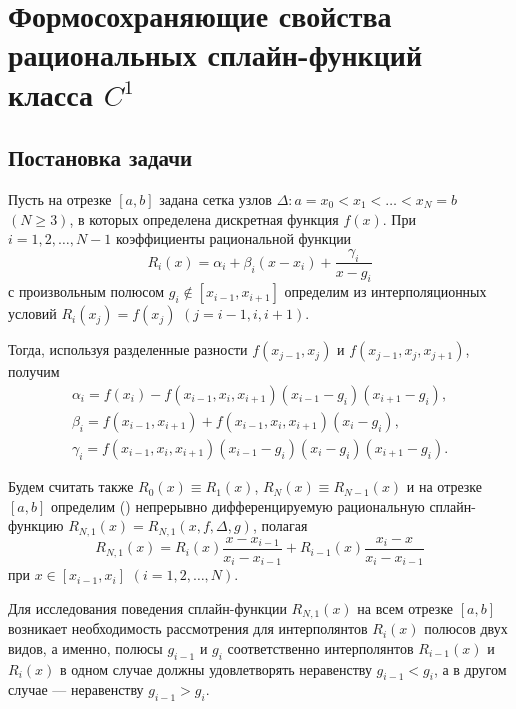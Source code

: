 
\chapter{Формосохраняющие свойства рациональных сплайн-функций класса $C^1$}%
\section{Постановка задачи}

Пусть на отрезке $[a,b]$ задана сетка узлов
$\Delta: a=x_0<x_1<\dots<x_N=b$ $(N\geqslant 3)$,
в которых определена дискретная функция $f(x)$. При $i=1,2,\dots,N-1$ коэффициенты
рациональной функции
\begin{equation}\label{ark-1.1}
R_i(x)=\alpha_i+\beta_i (x-x_i)+\frac{\gamma_i}{x-g_i}
\end{equation}
с произвольным полюсом $g_i\not \in [x_{i-1},x_{i+1}]$ определим из интерполяционных условий
$R_i(x_j)=f(x_j)$ $(j=i-1,i,i+1)$.

Тогда, используя разделенные разности $f(x_{j-1}, x_j)$ и $f(x_{j-1}, x_j, x_{j+1})$, получим
\begin{equation}
\begin{array}{l}
\alpha_i=f(x_i)-f(x_{i-1}, x_i, x_{i+1})(x_{i-1}-g_i)(x_{i+1}-g_i),\\
\beta_i=f(x_{i-1}, x_{i+1})+f(x_{i-1}, x_i, x_{i+1})(x_i-g_i),\\
\gamma_i=f(x_{i-1}, x_i, x_{i+1})(x_{i-1}-g_i)(x_i-g_i)(x_{i+1}-g_i).
\end{array}\label{ark-1.2}
\end{equation}

Будем считать также $R_0(x)\equiv R_1(x)$, $R_N(x)\equiv R_{N-1}(x)$ и на отрезке $[a,b]$
определим \linebreak(\cite{ark-12}) непрерывно дифференцируемую рациональную сплайн-функцию
$R_{N,1}(x)=R_{N,1} (x, f, \Delta, g)$, полагая
\begin{equation}\label{ark-1.3}
R_{N,1}(x)=R_i(x)\frac{x-x_{i-1}}{x_i-x_{i-1}}+R_{i-1} (x)\frac{x_i-x}{x_i-x_{i-1}}
\end{equation}
при $x\in[x_{i-1},x_i]$ $(i=1,2,\dots,N)$.

Для исследования поведения сплайн-функции $R_{N,1}(x)$  на всем отрезке $[a,b]$ возникает
необходимость рассмотрения  для интерполянтов $R_i(x)$ полюсов  двух видов, а именно,
полюсы $g_{i-1}$ и $g_i$ соответственно интерполянтов
$R_{i-1} (x)$ и $R_i(x)$ в одном случае должны удовлетворять неравенству $g_{i-1}<g_i$,
 а в другом случае --- неравенству $g_{i-1}>g_i$.

